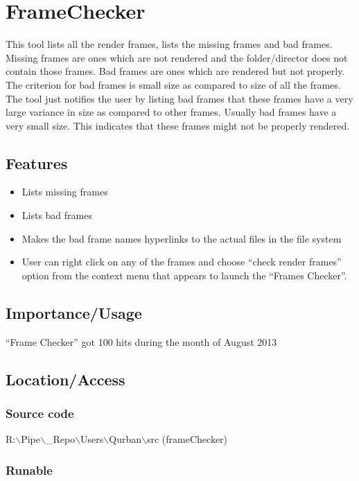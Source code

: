 \section{FrameChecker}

This tool lists all the render frames, lists the missing frames and bad
frames. Missing frames are ones which are not rendered and the folder/director
does not contain those frames. Bad frames are ones which are rendered but not
properly. The criterion for bad frames is small size as compared to size of
all the frames. The tool just notifies the user by listing bad frames that
these frames have a very large variance in size as compared to other frames.
Usually bad frames have a very small size. This indicates that these frames
might not be properly rendered.

\subsection*{Features}

\begin{itemize}
\item Lists missing frames
\item Lists bad frames
\item Makes the bad frame names hyperlinks to the actual files in  the file
system
\item User can right click on any of the frames and choose “check render
frames” option from the context menu that appears to launch the “Frames
Checker”.
\end{itemize}

\subsection*{Importance/Usage}

“Frame Checker” got 100 hits during the month of August 2013

\subsection*{Location/Access}

\subsubsection*{Source code} 

R:$\backslash$Pipe$\backslash$\_Repo$\backslash$Users$\backslash$Qurban$\backslash$src (frameChecker)

\subsubsection*{Runable} 

